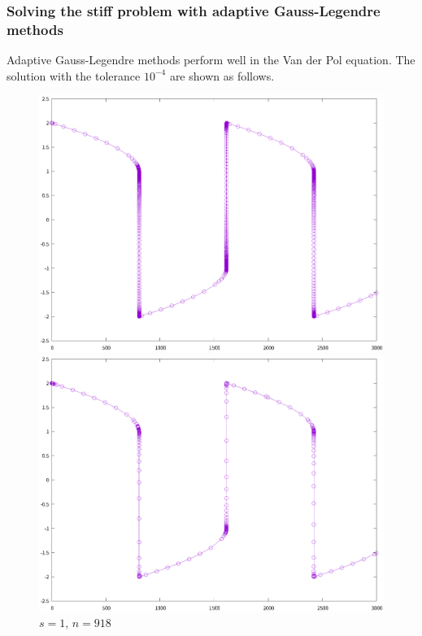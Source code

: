 \documentclass[9pt]{beamer}
\begin{document}
\begin{frame}
  \frametitle{Solving the stiff problem with adaptive Gauss-Legendre methods}
  Adaptive Gauss-Legendre methods perform well in the Van der Pol equation. The solution with the tolerance $10^{-4}$ are shown as follows.

\begin{figure}[H]
  \centering
  \begin{minipage}[t]{0.32\linewidth}
      \centering
      \includegraphics[width=0.95\linewidth]{pic/7-4.eps}
      \vspace{-1em}
      \caption{\small $s=1$, $n=918$}
  \end{minipage}
  \begin{minipage}[t]{0.32\linewidth}
      \centering
      \includegraphics[width=0.95\linewidth]{pic/7-5.eps}

\end{minipage}
\end{figure}
\end{frame}
\end{document}
